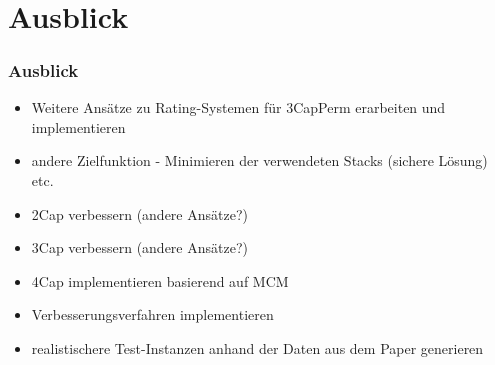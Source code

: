 \documentclass{beamer}
\begin{document}
\begin{frame}
\begin{figure}[H]
\begin{subfigure}[b]{0.4\textwidth}
\end{subfigure}
$\quad\quad\quad\quad$
\begin{subfigure}[b]{0.4\textwidth}
\centering
{}
\end{subfigure}

\end{figure}

\begin{figure}[H]
\centering
{}
\end{figure}

\end{frame}

\section{Ausblick}

\begin{frame}
\frametitle{Ausblick}
\begin{itemize}
  \item Weitere Ansätze zu Rating-Systemen für 3CapPerm erarbeiten und implementieren
  \item andere Zielfunktion - Minimieren der verwendeten Stacks (sichere Lösung) etc.
  \item 2Cap verbessern (andere Ansätze?)
  \item 3Cap verbessern (andere Ansätze?)
  \item 4Cap implementieren basierend auf MCM
  \item Verbesserungsverfahren implementieren
  \item realistischere Test-Instanzen anhand der Daten aus dem Paper generieren
\end{itemize}
\end{frame}
\end{document}
